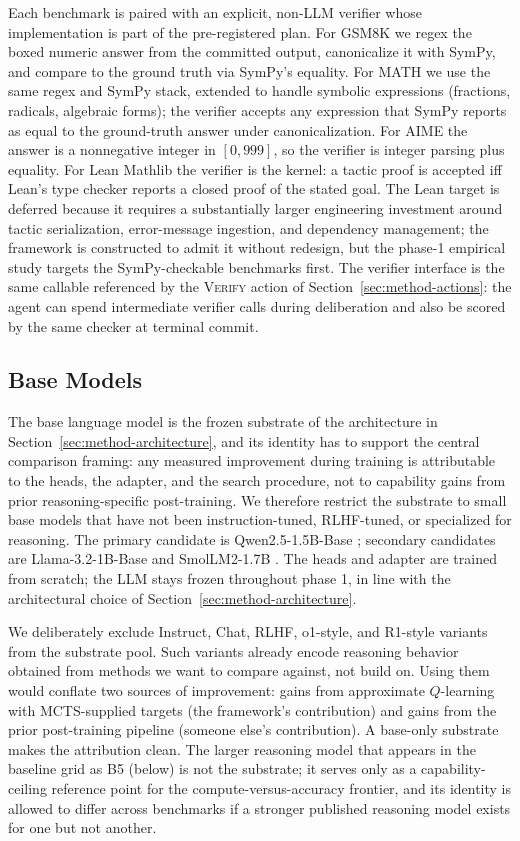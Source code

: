 Each benchmark is paired with an explicit, non-LLM verifier whose
implementation is part of the pre-registered plan. For GSM8K we regex
the boxed numeric answer from the committed output, canonicalize it
with SymPy, and compare to the ground truth via SymPy's equality. For
MATH we use the same regex and SymPy stack, extended to handle
symbolic expressions (fractions, radicals, algebraic forms); the
verifier accepts any expression that SymPy reports as equal to the
ground-truth answer under canonicalization. For AIME the answer is a
nonnegative integer in $[0, 999]$, so the verifier is integer parsing
plus equality. For Lean Mathlib the verifier is the kernel: a tactic
proof is accepted iff Lean's type checker reports a closed proof of the
stated goal. The Lean target is deferred because it requires a
substantially larger engineering investment around tactic
serialization, error-message ingestion, and dependency management; the
framework is constructed to admit it without redesign, but the phase-1
empirical study targets the SymPy-checkable benchmarks first. The
verifier interface is the same callable referenced by the
\textsc{Verify} action of Section~\ref{sec:method-actions}: the
agent can spend intermediate verifier calls during deliberation and
also be scored by the same checker at terminal commit.

\subsection{Base Models}
\label{sec:exp-models}

The base language model is the frozen substrate of the architecture in
Section~\ref{sec:method-architecture}, and its identity has to support
the central comparison framing: any measured improvement during
training is attributable to the heads, the adapter, and the search
procedure, not to capability gains from prior reasoning-specific
post-training. We therefore restrict the substrate to small base models
that have not been instruction-tuned, RLHF-tuned, or specialized for
reasoning. The primary candidate is Qwen2.5-1.5B-Base
\citep{yang2024qwen25}; secondary candidates are Llama-3.2-1B-Base
\citep{dubey2024llama3} and SmolLM2-1.7B \citep{allal2024smollm2}. The
heads and adapter are trained from scratch; the LLM stays frozen
throughout phase 1, in line with the architectural choice of
Section~\ref{sec:method-architecture}.

We deliberately exclude Instruct, Chat, RLHF, o1-style, and R1-style
variants \citep{openai2024o1, guo2025deepseekr1} from the substrate
pool. Such variants already encode reasoning behavior obtained from
methods we want to compare against, not build on. Using them would
conflate two sources of improvement: gains from approximate
$Q$-learning with MCTS-supplied targets (the framework's contribution)
and gains from the prior post-training pipeline (someone else's
contribution). A base-only substrate makes the attribution clean. The
larger reasoning model that appears in the baseline grid as B5 (below)
is not the substrate; it serves only as a capability-ceiling reference
point for the compute-versus-accuracy frontier, and its identity is
allowed to differ across benchmarks if a stronger published reasoning
model exists for one but not another.

